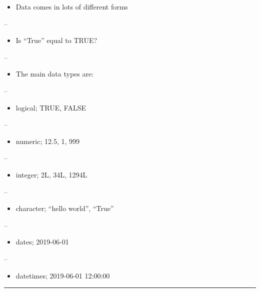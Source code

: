 \documentclass[]{article}
\providecommand{\tightlist}{%
  \setlength{\itemsep}{0pt}\setlength{\parskip}{0pt}}
\begin{document}
\begin{itemize}
\tightlist
\item
  Data comes in lots of different forms
\end{itemize}

--

\begin{itemize}
\tightlist
\item
  Is ``True'' equal to TRUE?
\end{itemize}

--

\begin{itemize}
\tightlist
\item
  The main data types are:
\end{itemize}

--

\begin{itemize}
\tightlist
\item
  logical; TRUE, FALSE
\end{itemize}

--

\begin{itemize}
\tightlist
\item
  numeric; 12.5, 1, 999
\end{itemize}

--

\begin{itemize}
\tightlist
\item
  integer; 2L, 34L, 1294L
\end{itemize}

--

\begin{itemize}
\tightlist
\item
  character; ``hello world'', ``True''
\end{itemize}

--

\begin{itemize}
\tightlist
\item
  dates; 2019-06-01
\end{itemize}

--

\begin{itemize}
\tightlist
\item
  datetimes; 2019-06-01 12:00:00
\end{itemize}

\begin{center}\rule{0.5\linewidth}{\linethickness}\end{center}
\end{document}
